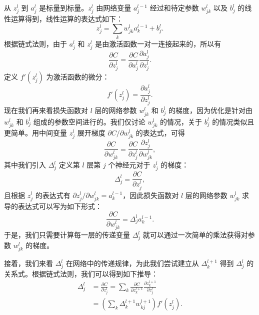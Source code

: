 从 $z_j^l$ 到 $a_j^l$ 是标量到标量。$z_j^l$ 由网络变量 $a_j^{l-1}$ 经过和待定参数 $w_{jk}^l$ 以及 $b_j^l$ 的线性运算得到，线性运算的表达式如下：
\begin{equation}
z_j^l=\sum_k w_{jk}^l a_k^{l-1}+b_j^l.
\tag{8.3.14}
\end{equation}
根据链式法则，由于 $a_j^l$ 和 $z_j^l$ 是由激活函数一对一连接起来的，所以有
\begin{equation}
\frac{\partial C}{\partial z_j^l}=\frac{\partial C}{\partial a_j^l}\frac{\partial a_j^l}{\partial z_j^l}.
\tag{8.3.15}
\end{equation}
定义 $f'(z_j^l)$ 为激活函数的微分：
\begin{equation}
f'(z_j^l)=\frac{\partial a_j^l}{\partial z_j^l}.
\tag{8.3.16}
\end{equation}
现在我们再来看损失函数对 $l$ 层的网络参数 $w_{jk}^l$ 和 $b_j^l$ 的梯度，因为优化是针对由 $w_{jk}^l$ 和 $b_j^l$ 组成的参数空间进行的。我们仅讨论 $w_{jk}^l$ 的情况，关于 $b_j^l$ 的情况类似且更简单。用中间变量 $z_j^l$ 展开梯度 $\partial C/\partial w_{jk}^l$ 的表达式，可得
\begin{equation}
\frac{\partial C}{\partial w_{jk}^l}=\frac{\partial C}{\partial z_j^l}\frac{\partial z_j^l}{\partial w_{jk}^l},
\tag{8.3.17}
\end{equation}
其中我们引入 $\Delta_j^l$ 定义第 $l$ 层第 $j$ 个神经元对于 $z_j^l$ 的梯度：
\begin{equation}
\Delta_j^l=\frac{\partial C}{\partial z_j^l},
\tag{8.3.18}
\end{equation}
且根据 $z_j^l$ 的表达式有 $\partial z_j^l/\partial w_{jk}^l=a_k^{l-1}$，因此损失函数对 $l$ 层的网络参数 $w_{jk}^l$ 求导的表达式可以写为如下形式：
\begin{equation}
\frac{\partial C}{\partial w_{jk}^l}=\Delta_j^l a_k^{l-1}.
\tag{8.3.19}
\end{equation}
于是，我们只需要计算每一层的传递变量 $\Delta_j^l$ 就可以通过一次简单的乘法获得对参数 $w_{jk}^l$ 的梯度。

接着，我们来看 $\Delta_j^l$ 在网络中的传递规律，为此我们尝试建立从 $\Delta_k^{l+1}$ 得到 $\Delta_j^l$ 的关系式。根据链式法则，我们可以得到如下推导：
\begin{equation}
\begin{aligned}
\Delta_j^l
&=\frac{\partial C}{\partial z_j^l}
=\sum_k\frac{\partial C}{\partial z_k^{l+1}}\frac{\partial z_k^{l+1}}{\partial z_j^l}\\
&=\left(\sum_k\Delta_k^{l+1}w_{kj}^{l+1}\right)f'(z_j^l).
\end{aligned}
\tag{8.3.20}
\end{equation}

